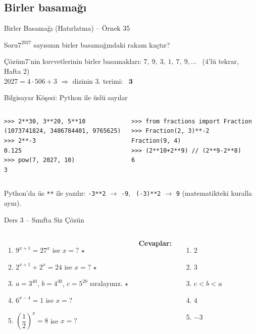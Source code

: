 \documentclass[aspectratio=169,11pt]{beamer}
\newcommand{\soru}[3]{%
\begin{frame}{#1}
  \begin{block}{Soru}\large #2\end{block}
  \pause
  \begin{exampleblock}{Çözüm}\large #3\end{exampleblock}
\end{frame}}
\begin{document}
\subsection{Birler basamağı}
\soru{Birler Basamağı (Hatırlatma) -- Örnek 35}
{\(7^{2027}\) sayısının birler basamağındaki rakam kaçtır?}
{\(7\)'nin kuvvetlerinin birler basamakları: \(7,\ 9,\ 3,\ 1,\ 7,\ 9,\dots\) \ (\(4\)'lü tekrar, Hafta 2)\\[4pt]
\(2027=4\cdot 506+3\) \(\Rightarrow\) dizinin \(3\). terimi: \ \(\mathbf{3}\)}

\begin{frame}[fragile]{Bilgisayar Köşesi: Python ile üslü sayılar}
\begin{columns}[t]
\begin{verbatim}
>>> 2**30, 3**20, 5**10
(1073741824, 3486784401, 9765625)
>>> 2**-3
0.125
>>> pow(7, 2027, 10)
3
\end{verbatim}
\begin{verbatim}
>>> from fractions import Fraction
>>> Fraction(2, 3)**-2
Fraction(9, 4)
>>> (2**10+2**9) // (2**9-2**8)
6
\end{verbatim}
\end{columns}
\small Python'da üs \verb|**| ile yazılır: \verb|-3**2| \(\to\) \verb|-9|, \ \verb|(-3)**2| \(\to\) \verb|9| (matematikteki kuralla aynı).
\end{frame}

\begin{frame}{Ders 3 -- Sınıfta Siz Çözün}
\begin{columns}[t]
\begin{enumerate}
\item \(9^{x+1}=27^{x}\) ise \(x=?\) \(\star\)
\item \(2^{x+1}+2^{x}=24\) ise \(x=?\) \(\star\)
\item \(a=3^{40}\), \(b=4^{30}\), \(c=5^{20}\) sıralayınız. \(\star\)
\item \(6^{x-4}=1\) ise \(x=?\)
\item \(\left(\dfrac12\right)^{x}=8\) ise \(x=?\)
\end{enumerate}
\pause
\textbf{Cevaplar:}
\begin{enumerate}
\item \(2\)
\item \(3\)
\item \(c<b<a\)
\item \(4\)
\item \(-3\)
\end{enumerate}
\end{columns}
\vspace{4pt}{\footnotesize \(\star\) işaretli soruların adım adım çözümü sonraki slaytlardadır.}
\end{frame}
\end{document}
